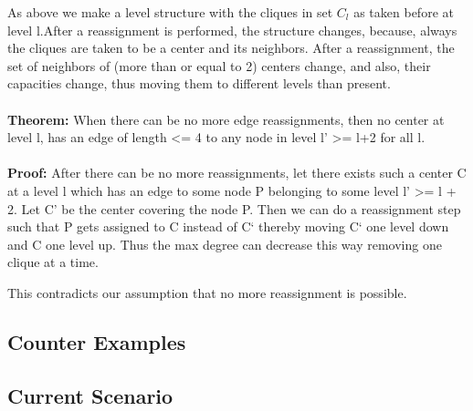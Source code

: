 \documentclass[12pt,a4paper,onecolumn]{article}
\begin{document}
\begin{itemize}
\begin{figure}
\end{figure}
As above we make a level structure with the cliques in set $C_l$ as taken before at level l.After a reassignment is performed, the structure changes, because, always the cliques are taken to be a center and its neighbors. After a reassignment, the set of neighbors of (more than or equal to 2) centers change, and also, their capacities change, thus moving them to different levels than present. \\\\\textbf{Theorem:}
When there can be no more edge reassignments, then no center at level l, has an edge of length <= 4 to any node in level l’ >= l+2 for all l. 
\\\\
\textbf{Proof:}
After there can be no more reassignments, let there exists such a center C at a level l which has an edge to some node P belonging to some level l’ >= l + 2. Let C’ be the center covering the node P. Then we can do a reassignment step such that P gets assigned to C instead of C` thereby moving C` one level down and C one level up. Thus the max degree can decrease this way removing one clique at a time. 


\begin{figure}

\end{figure}

This contradicts our assumption that no more reassignment is possible.

\end{itemize}
\subsection{Counter Examples}
\subsection{Current Scenario}
\end{document}
